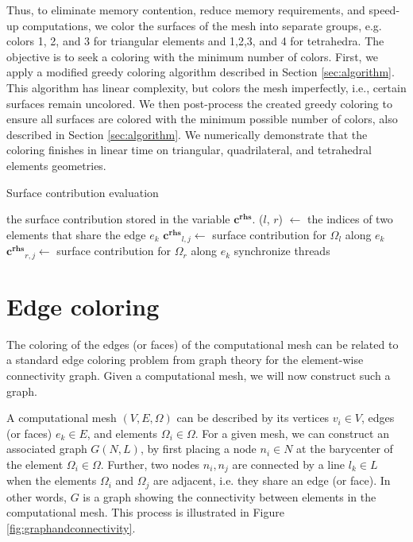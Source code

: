 \documentclass[12pt]{article}
\begin{document}
Thus, to eliminate memory contention, reduce memory requirements, and speed-up computations, we color the surfaces of the mesh into separate groups, e.g. colors 1, 2, and 3 for triangular elements and 1,2,3, and 4 for tetrahedra.  The objective is to seek a coloring with the minimum number of colors.  First, we apply a modified greedy coloring algorithm described in Section \ref{sec:algorithm}.  This algorithm has linear complexity, but colors the mesh imperfectly, i.e., certain surfaces remain uncolored.  We then post-process the created greedy coloring to ensure all surfaces are colored with the minimum possible number of colors, also described in Section \ref{sec:algorithm}.  We numerically demonstrate that the coloring finishes in linear time on triangular, quadrilateral, and tetrahedral elements geometries.

\begin{algorithm}
	\caption{Surface contribution evaluation}  \label{alg:fluxeval}
	\begin{algorithmic}
		\Ensure the surface contribution stored in the variable $\mathbf{c^{rhs}}$. 
		\State ($l$, $r$) $\gets$ the indices of two elements that share the edge $e_k$
		\State $\mathbf{c^{rhs}}_{l,j}\gets$ surface contribution for $\Omega_l$ along $e_k$
		\State $\mathbf{c^{rhs}}_{r,j}\gets$ surface contribution for $\Omega_r$ along $e_k$
		\EndFor
		\EndFor
		\State synchronize threads
		\EndFor
		
		\EndProcedure
	\end{algorithmic}  
\end{algorithm}




\section{Edge coloring}

The coloring of the edges (or faces) of the computational mesh can be related to a standard edge coloring problem from graph theory for the element-wise connectivity graph.  Given a computational mesh, we will now construct such a graph.

A computational mesh $(V,E,\Omega)$ can be described by its vertices $v_i \in V$, edges (or faces) $e_k \in E$, and elements $\Omega_i \in \Omega$.  For a given mesh, we can construct an associated graph $G(N,L)$, by first placing a node $n_i \in N$ at the barycenter of the element $\Omega_i \in \Omega$.  Further, two nodes $n_i, n_j$ are connected by a line $l_k \in L$ when the elements $\Omega_i$ and $\Omega_j$ are adjacent, i.e. they share an edge (or face).  In other words, $G$ is a graph showing the connectivity between elements in the computational mesh.  This process is illustrated in Figure \ref{fig:graphandconnectivity}.
\end{document}
